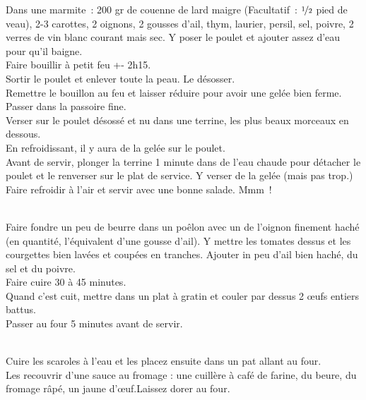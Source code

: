 \begin{minipage}[c]{\textwidth}
Dans une marmite : 200 gr de couenne de lard maigre (Facultatif : $\nicefrac{1}{2}$ pied de veau), 2-3 carottes, 2 oignons, 2 gousses d’ail, thym, laurier, persil, sel, poivre, 2 verres de vin blanc courant mais sec. Y poser le poulet et ajouter assez d’eau pour qu’il baigne.\\
Faire bouillir à petit feu +- 2h15. \\
Sortir le poulet et enlever toute la peau. Le désosser. \\
Remettre le bouillon au feu et laisser réduire pour avoir une gelée bien ferme. Passer dans la passoire fine. \\
Verser sur le poulet désossé et nu dans une terrine, les plus beaux morceaux en dessous. \\
En refroidissant, il y aura de la gelée sur le poulet. \\
Avant de servir, plonger la terrine 1 minute dans de l’eau chaude pour détacher le poulet et le renverser sur le plat de service. Y verser de la gelée (mais pas trop.) \\
Faire refroidir à l’air et servir avec une bonne salade. Mmm !\\
\\

\end{minipage}

\begin{minipage}[c]{\textwidth}
Faire fondre un peu de beurre dans un poêlon avec un de l’oignon finement haché (en quantité, l’équivalent d’une gousse d’ail). Y mettre les tomates dessus et les courgettes bien lavées et coupées en tranches. Ajouter in peu d’ail bien haché, du sel et du poivre. \\
Faire cuire 30 à 45 minutes.\\
Quand c’est cuit, mettre dans un plat à gratin et couler par dessus 2 œufs entiers battus.\\
Passer au four 5 minutes avant de servir. \\
\\

\end{minipage}

\begin{minipage}[c]{\textwidth}
Cuire les scaroles à l'eau et les placez ensuite dans un pat allant au four.\\
Les recouvrir d'une sauce au fromage : une cuillère à café de farine, du beure, du fromage râpé, un jaune d'œuf.Laissez dorer au four.\\
\\

\end{minipage}


